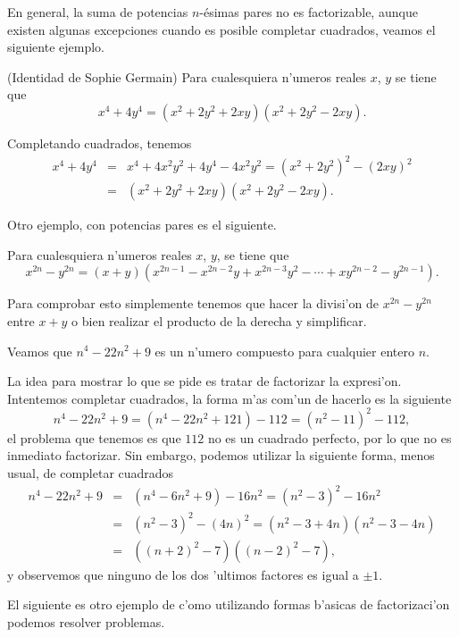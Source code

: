 \noindent En general, la suma de potencias $n$-\'esimas pares no es factorizable, aunque existen algunas
excepciones cuando es posible completar cuadrados, veamos el siguiente ejemplo.

\begin{ejemplo}(Identidad de Sophie Germain) Para cualesquiera n'umeros reales $x$, $y$ se tiene que
\label{sophiegermain}
$$
x^{4}+4y^{4} =(x^{2}+2y^{2}+2xy)(x^{2}+2y^{2}-2xy).
$$
\end{ejemplo}

\noindent Completando cuadrados, tenemos
\begin{eqnarray*}
     x^{4}+4y^{4} & = & x^{4}+4x^2y^2+4y^{4}- 4x^2y^2=(x^{2}+2y^{2})^2-(2xy)^2\\
            & = &(x^{2}+2y^{2}+2xy)(x^{2}+2y^{2}-2xy).
\end{eqnarray*}

\noindent Otro ejemplo, con potencias pares es el siguiente.

\begin{ejemplo} Para cualesquiera n'umeros reales $x$, $y$, se tiene que
$$
x^{2n}-y^{2n} =(x+y)(x^{2n-1}-x^{2n-2}y+x^{2n-3}y^{2}-\cdots+xy^{2n-2}-
y^{2n-1}).
$$
\end{ejemplo}
\noindent Para comprobar esto simplemente tenemos que hacer la divisi'on de $x^{2n}-y^{2n}$ entre $x+y$ o bien realizar el producto de la derecha y simplificar.

\begin{ejemplo} Veamos que  $n^4 - 22n^2+9$ es un n'umero compuesto para cualquier entero $n$.
\end{ejemplo}
La idea para mostrar lo que se pide es tratar de factorizar la expresi'on. Inten\-temos completar cuadrados, la forma m'as com'un de hacerlo es la siguiente
$$
         n^4-22n^2+9= (n^4 - 22n^2 + 121)-112=(n^2 - 11)^2-112,
$$
el problema que tenemos es que $112$ no es un cuadrado perfecto, por lo que no es inmediato factorizar. Sin embargo, podemos utilizar la siguiente forma, menos usual, de completar cuadrados
\begin{eqnarray*}
n^4-22n^2+9 & = & (n^4 - 6n^2 + 9)- 16n^2=(n^2-3)^2-16n^2\\
            & = & (n^2-3)^2-(4n)^2=(n^2-3+4n)(n^2-3-4n)\\
            & = & ((n+2)^2-7)((n-2)^2-7),
\end{eqnarray*}
y observemos que ninguno de los dos 'ultimos factores es igual a $\pm 1$.
\vei

\noindent El siguiente es otro ejemplo de c'omo utilizando formas b'asicas de 
factorizaci'on podemos  resolver problemas.

